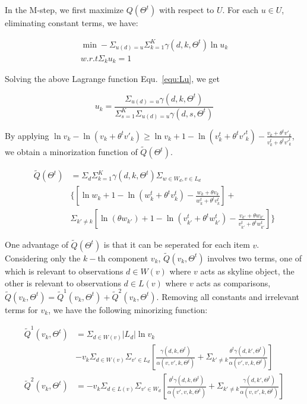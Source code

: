 \documentclass[sigconf]{acmart}
\begin{document}
In the M-step, we first maximize $Q(\Theta^t)$ with respect to $U$. For each $u \in U$, eliminating constant terms, we have:

\begin{align}\label{equ:Lu}
\min -\Sigma_{u(d)=u} \Sigma_{k=1}^K \gamma(d,k,\Theta^t) \ln u_k\\ \nonumber
w.r.t \Sigma_k u_k =1
\end{align}
 
Solving the above Lagrange function Equ.~\ref{equ:Lu}, we get 

\begin{equation}\label{equ:u}
u_k =\frac{\Sigma_{u(d)=u}\gamma(d,k,\Theta^t)}{\Sigma_{s=1}^K \Sigma_{u(d)=u}\gamma(d,s,\Theta^t)}
\end{equation}

By applying $\ln v_k - \ln (v_k + \theta^t v'_k) \geq \ln v_k + 1 - \ln (v_k^t + \theta^t {v'}_k^t) - \frac{v_k + \theta^t v'_k}{v_k^t + \theta^t {v'}_k^t}$, we obtain a minorization function of $\tilde{Q}(\Theta^t)$.

\begin{align}\label{equ:minorization}
\tilde{Q}(\Theta^t) &= \Sigma_d \Sigma_{k=1}^K \gamma(d,k,\Theta^t)  \Sigma_{w\in W_d, v\in L_d} \\\nonumber
& \{ [\ln w_k + 1 - \ln (w_k^t + \theta^t v_k^t) - \frac{w_k+\theta v_k}{w_k^t + \theta^tv_k^t}]+\\\nonumber
&\Sigma_{k'\neq k} [\ln (\theta w_{k'}) + 1 - \ln (v_{k'}^t + \theta^t w_{k'}^t) -  \frac{v_{k'}+\theta w_{k'}}{v_{k'}^t + \theta^tw_{k'}^t}]
\}
\end{align}

One advantage of $\tilde{Q}(\Theta^t)$ is that it can be seperated for each item $v$. Considering only the $k-$th component $v_k$, $\tilde{Q}(v_k,\Theta^t)$ involves two terms, one of which is relevant to observations $d\in W(v)$ where $v$ acts as skyline object, the other is relevant to observations $d \in L(v)$ where $v$ acts as comparisons, $\tilde{Q}(v_k,\Theta^t)=\tilde{Q}^1(v_k,\Theta^t)+\tilde{Q}^2(v_k,\Theta^t)$. Removing all constants and irrelevant terms for $v_k$, we have the following minorizing function:

\begin{align*}%
\tilde{Q}^1(v_k,\Theta^t) & = \Sigma_{d\in W(v)} |L_d| \ln v_k \\\nonumber
& -v_k\Sigma_{d\in W(v)}\Sigma_{v'\in L_d} [\frac{\gamma(d,k,\Theta^t)}{ \alpha(v,v',k,\Theta^t)} +\Sigma_{k'\neq k}\frac{\theta^t\gamma(d,k',\Theta^t)}{\alpha(v',v,k,\Theta^t)}]\\ \nonumber
\tilde{Q}^2(v_k,\Theta^t) & = -v_k \Sigma_{d\in L(v)}\Sigma_{v'\in W_d} [\frac{\theta^t \gamma(d,k,\Theta^t)}{\alpha(v',v,k,\Theta^t)}+\Sigma_{k'\neq k} \frac{\gamma(d,k',\Theta^t)}{\alpha(v,v',k,\Theta^t)}] 
\end{align*}
\end{document}
